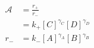 \begin{eqnarray}
\mathcal{A} &= \frac{r_+}{r_-} \\  & =  k_+[C]^{\gamma_C}[D]^{\gamma_D} \\
r_-  & =  k_-[A]^{\gamma_A}[B]^{\gamma_B} \\
\end{eqnarray}